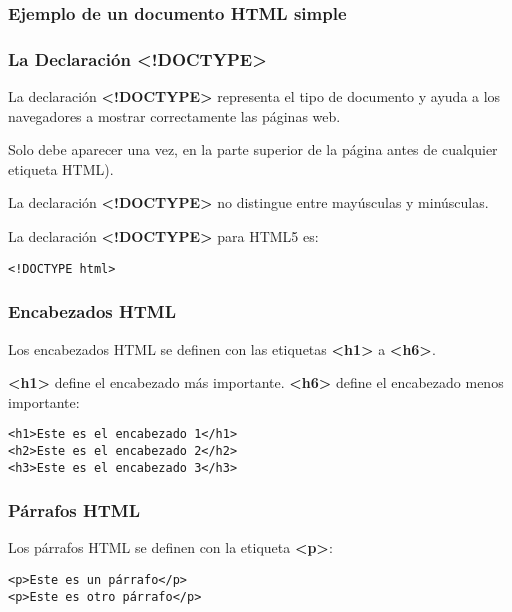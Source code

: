 \begin{frame}[fragile]
  \frametitle{Ejemplo de un documento HTML simple}
  
\end{frame}

\begin{frame}[fragile]
  \frametitle{La Declaración <!DOCTYPE>}

  La declaración \textbf{<!DOCTYPE>} representa el tipo de documento
  y ayuda a los navegadores a mostrar correctamente las páginas web.

  Solo debe aparecer una vez, en la parte superior de la página
  antes de cualquier etiqueta HTML).

  La declaración \textbf{<!DOCTYPE>} no distingue entre mayúsculas
  y minúsculas.

  La declaración \textbf{<!DOCTYPE>} para HTML5 es:

  \vspace{\baselineskip}
  \begin{lstlisting}
<!DOCTYPE html>
  \end{lstlisting}
\end{frame}

\begin{frame}[fragile]
  \frametitle{Encabezados HTML}

  Los encabezados HTML se definen con las etiquetas \textbf{<h1>} a
  \textbf{<h6>}.

  \textbf{<h1>} define el encabezado más importante.
  \textbf{<h6>} define el encabezado menos importante:

  \vspace{\baselineskip}
  \begin{lstlisting}
<h1>Este es el encabezado 1</h1>
<h2>Este es el encabezado 2</h2>
<h3>Este es el encabezado 3</h3>
  \end{lstlisting}
\end{frame}

\begin{frame}[fragile]
  \frametitle{Párrafos HTML}

  Los párrafos HTML se definen con la etiqueta \textbf{<p>}:

  \vspace{\baselineskip}
  \begin{lstlisting}
<p>Este es un párrafo</p>
<p>Este es otro párrafo</p>
  \end{lstlisting}
\end{frame}

